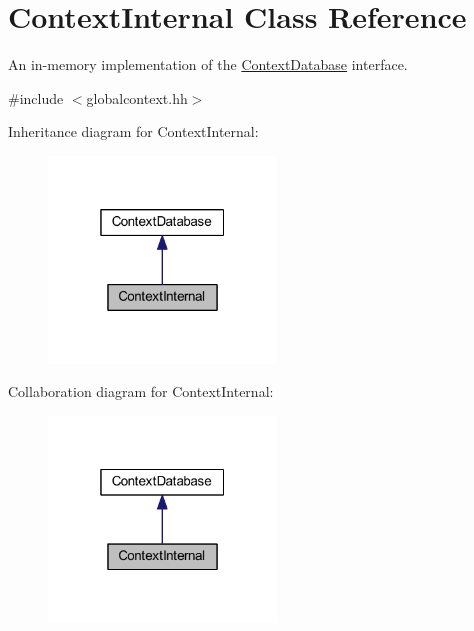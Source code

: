 \hypertarget{class_context_internal}{}\section{Context\+Internal Class Reference}
\label{class_context_internal}


An in-\/memory implementation of the \mbox{\hyperlink{class_context_database}{Context\+Database}} interface.  




{\ttfamily \#include $<$globalcontext.\+hh$>$}



Inheritance diagram for Context\+Internal\+:
\nopagebreak
\begin{figure}[H]
\begin{center}
\leavevmode
\includegraphics[width=172pt]{class_context_internal__inherit__graph}
\end{center}
\end{figure}


Collaboration diagram for Context\+Internal\+:
\nopagebreak
\begin{figure}[H]
\begin{center}
\leavevmode
\includegraphics[width=172pt]{class_context_internal__coll__graph}
\end{center}
\end{figure}

